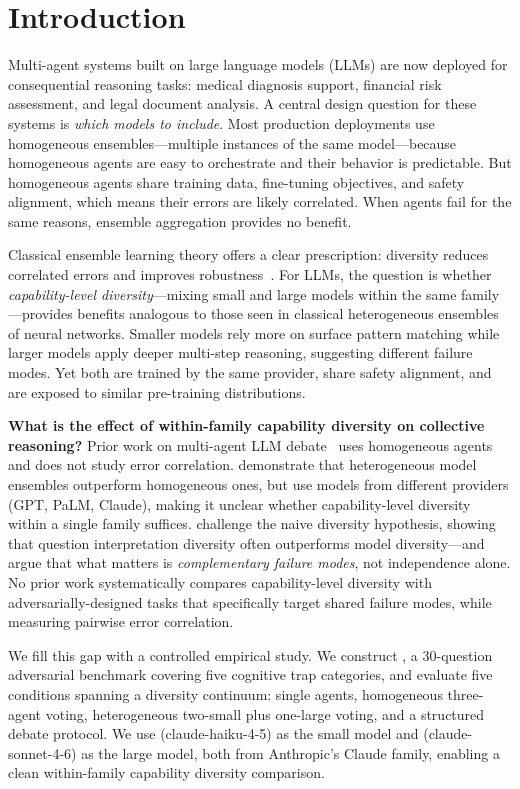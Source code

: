 \section{Introduction}
\label{sec:intro}

Multi-agent systems built on large language models (LLMs) are now deployed for
consequential reasoning tasks: medical diagnosis support, financial risk assessment,
and legal document analysis.
A central design question for these systems is \emph{which models to include}.
Most production deployments use homogeneous ensembles---multiple instances of the same model---because
homogeneous agents are easy to orchestrate and their behavior is predictable.
But homogeneous agents share training data, fine-tuning objectives, and safety alignment,
which means their errors are likely correlated.
When agents fail for the same reasons, ensemble aggregation provides no benefit.

Classical ensemble learning theory offers a clear prescription: diversity reduces correlated
errors and improves robustness~\citep{wu2023heterogeneous}.
For LLMs, the question is whether \emph{capability-level diversity}---mixing small
and large models within the same family---provides benefits analogous to those
seen in classical heterogeneous ensembles of neural networks.
Smaller models rely more on surface pattern matching while larger models apply
deeper multi-step reasoning, suggesting different failure modes.
Yet both are trained by the same provider, share safety alignment,
and are exposed to similar pre-training distributions.

{\bf What is the effect of within-family capability diversity on collective reasoning?}
Prior work on multi-agent LLM debate~\citep{du2023debate,liang2023mad}
uses homogeneous agents and does not study error correlation.
\citet{chen2023reconcile} demonstrate that heterogeneous model ensembles outperform
homogeneous ones, but use models from different providers (GPT, PaLM, Claude),
making it unclear whether capability-level diversity within a single family suffices.
\citet{rosales2025diverse} challenge the naive diversity hypothesis, showing that
question interpretation diversity often outperforms model diversity---and argue
that what matters is \emph{complementary failure modes}, not independence alone.
No prior work systematically compares capability-level diversity with
adversarially-designed tasks that specifically target shared failure modes,
while measuring pairwise error correlation.

We fill this gap with a controlled empirical study.
We construct \advbench, a 30-question adversarial benchmark covering
five cognitive trap categories, and evaluate five conditions spanning a
diversity continuum: single agents, homogeneous three-agent voting,
heterogeneous two-small plus one-large voting, and a structured debate protocol.
We use \haiku (claude-haiku-4-5) as the small model
and \sonnet (claude-sonnet-4-6) as the large model,
both from Anthropic's Claude family, enabling a clean
within-family capability diversity comparison.

